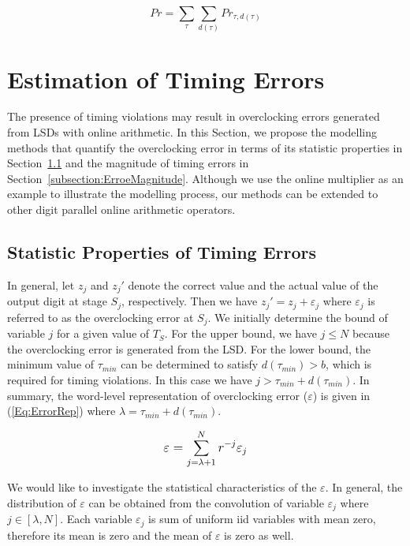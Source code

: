 \documentclass[journal]{IEEEtran}
\begin{document}
\begin{equation}\label{Eq:Prob_timingViol}
Pr= \sum_\tau \sum_{d(\tau)} Pr_{\tau,d(\tau )}
\end{equation}

\section{Estimation of Timing Errors}
The presence of timing violations may result in overclocking errors generated from LSDs with online arithmetic. In this Section, we propose the modelling methods that quantify the overclocking error in terms of its statistic properties in Section~\ref{subsection:ErrorDistribution} and the magnitude of timing errors in Section~\ref{subsection:ErroeMagnitude}. Although we use the online multiplier as an example to illustrate the modelling process, our methods can be extended to other digit parallel online arithmetic operators.


\subsection{Statistic Properties of Timing Errors}\label{subsection:ErrorDistribution}

In general, let $z_j$ and ${z_j}'$ denote the correct value and the actual value of the output digit at stage $S_j$, respectively. Then we have ${z_j}'=z_j+\varepsilon_j$ where $\varepsilon_j$ is referred to as the overclocking error at $S_j$. We initially determine the bound of variable $j$ for a given value of $T_S$. For the upper bound, we have $j\leqslant N$ because the overclocking error is generated from the LSD. For the lower bound, the minimum value of $\tau_{min}$ can be determined to satisfy $d(\tau_{min})>b$, which is required for timing violations. In this case we have $j>\tau_{min}+d(\tau_{min})$. In summary, the word-level representation of overclocking error ($\varepsilon$) is given in (\ref{Eq:ErrorRep}) where $\lambda=\tau_{min}+d(\tau_{min})$.

\begin{eqnarray}\label{Eq:ErrorRep}
\scriptsize
	\varepsilon = \sum_{j=\lambda+1}^{N} r^{-j}\varepsilon_j
\normalsize
\end{eqnarray}

We would like to investigate the statistical characteristics of the $\varepsilon$. In general, the distribution of $\varepsilon$ can be obtained from the convolution of variable $\varepsilon_j$ where $j\in[\lambda,N]$. Each variable $\varepsilon_j$ is sum of uniform iid variables with mean zero, therefore its mean is zero and the mean of $\varepsilon$ is zero as well.
\end{document}
